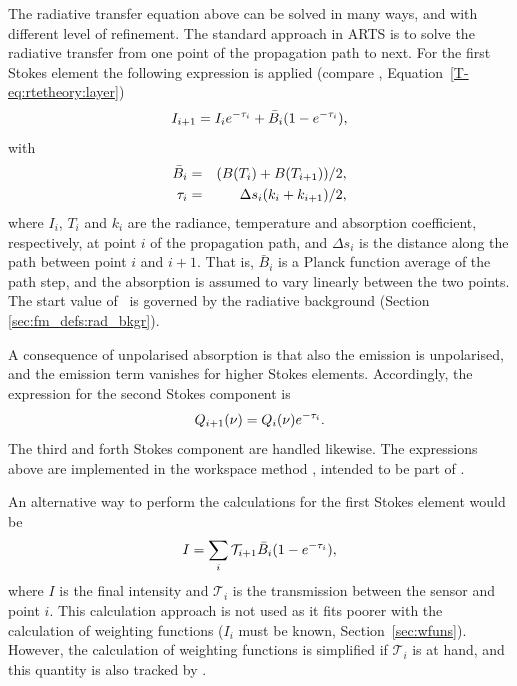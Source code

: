 The radiative transfer equation above can be solved in many ways, and with
different level of refinement. The standard approach in ARTS is to solve the
radiative transfer from one point of the propagation path to next. For the
first Stokes element the following expression is applied (compare \theory,
Equation~\ref{T-eq:rtetheory:layer})
\begin{equation}
  \label{eq:fm_defs:rte_step}
  I_{i+1} = I_ie^{-\tau_{i}} + \bar{B}_i(1-e^{-\tau_{i}}),
\end{equation}
with
\begin{eqnarray}
  \bar{B}_i &=& (B(T_i)+B(T_{i+1}))/2, \\
  \tau_{i} &=& \Delta s_i(k_i+k_{i+1})/2,  
  \label{eq:taustep}
\end{eqnarray}
where $I_i$, $T_i$ and $k_i$ are the radiance, temperature and absorption
coefficient, respectively, at point $i$ of the propagation path, and $\Delta
s_i$ is the distance along the path between point $i$ and $i+1$. That is,
$\bar{B}_i$ is a Planck function average of the path step, and the absorption
is assumed to vary linearly between the two points. The start value of \Mpi\ is
governed by the radiative background (Section \ref{sec:fm_defs:rad_bkgr}).

A consequence of unpolarised absorption is that also the emission is
unpolarised, and the emission term vanishes for higher Stokes elements.
Accordingly, the expression for the second Stokes component is
\begin{equation}
  Q_{i+1}(\nu) = Q_i(\nu)e^{-\tau_{i}}.
  \label{eq:fm_defs:rte_step2}
\end{equation}
The third and forth Stokes component are handled likewise. The expressions
above are implemented in the workspace method ,
intended to be part of .

An alternative way to perform the calculations for the first Stokes element
would be
\begin{equation}
  \label{eq:fm_defs:rte_alt}
  I = \sum_i \mathcal{T}_{i+1} \bar{B}_i(1-e^{-\tau_{i}}),
\end{equation}
where $I$ is the final intensity and $\mathcal{T}_i$ is the transmission
between the sensor and point $i$. This calculation approach is not used as it
fits poorer with the calculation of weighting functions ($I_i$ must be known,
Section~\ref{sec:wfuns}). However, the calculation of weighting functions is
simplified if $\mathcal{T}_i$ is at hand, and this quantity is also tracked by
.


